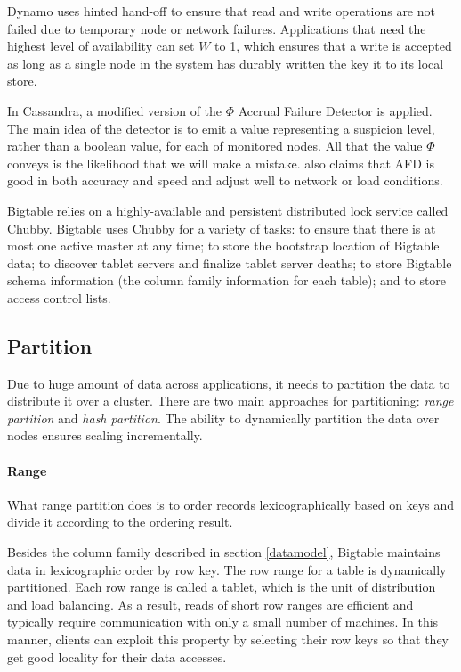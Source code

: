 \documentclass[letter,twocolumn]{article}
\begin{document}
Dynamo uses hinted hand-off to ensure that read and write operations are not failed due to temporary node or network failures. Applications that need the highest level of availability can set $W$ to 1, which ensures that a write is accepted as long as a single node in the system has durably written the key it to its local store. 

In Cassandra, a modified version of the $\Phi$ Accrual Failure Detector is applied. The main idea of the detector is to emit a value representing a suspicion level, rather than a boolean value, for each of monitored nodes. All that the value $\Phi$ conveys is the likelihood that we will make a mistake. \citep{LakshamAvinash2010} also claims that AFD is good in both accuracy and speed and adjust well to network or load conditions.

Bigtable relies on a highly-available and persistent distributed lock service called Chubby\citep{Burrows2006}. Bigtable uses Chubby for a variety of tasks: to ensure that there is at most one active master at any time; to store the bootstrap location of Bigtable data; to discover tablet servers and finalize tablet server deaths; to store Bigtable schema information (the column family information for each table); and to store access control lists.

\subsection{Partition}
Due to huge amount of data across applications, it needs to partition the data to distribute it over a cluster. There are two main approaches for partitioning: \textit{range partition} and \textit{hash partition}. The ability to dynamically partition the data over nodes ensures scaling incrementally. 

\paragraph*{Range}
What range partition does is to order records lexicographically based on keys and divide it according to the ordering result.

Besides the column family described in section \ref{datamodel}, Bigtable maintains data in lexicographic order by row key. The row range for a table is dynamically partitioned. Each row range is called a tablet, which is the unit of distribution and load balancing. As a result, reads of short row ranges are efficient and typically require communication with only a small number of machines. In this manner, clients can exploit this property by selecting their row keys so that they get good locality for their data accesses.
\end{document}
